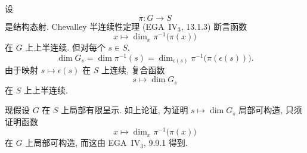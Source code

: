 设
\[
  \pi:G\longrightarrow S
\]
是结构态射. Chevalley 半连续性定理 (EGA~IV\(_3\), 13.1.3) 断言函数
\[
  x\longmapsto\dim_x\pi^{-1}\bigl(\pi(x)\bigr)
\]
在 \(G\) 上上半连续. 但对每个 \(s\in S\),
\[
  \dim G_s
    =\dim\pi^{-1}(s)
    =\dim_{\epsilon(s)}
       \pi^{-1}\bigl(\pi(\epsilon(s))\bigr).
\]
由于映射 \(s\mapsto\epsilon(s)\) 在 \(S\) 上连续, 复合函数
\[
  s\longmapsto\dim G_s
\]
在 \(S\) 上上半连续.

现假设 \(G\) 在 \(S\) 上局部有限呈示. 如上论证,
为证明 \(s\mapsto\dim G_s\) 局部可构造, 只须证明函数
\[
  x\longmapsto\dim_x\pi^{-1}\bigl(\pi(x)\bigr)
\]
在 \(G\) 上局部可构造, 而这由 EGA~IV\(_3\), 9.9.1 得到.

